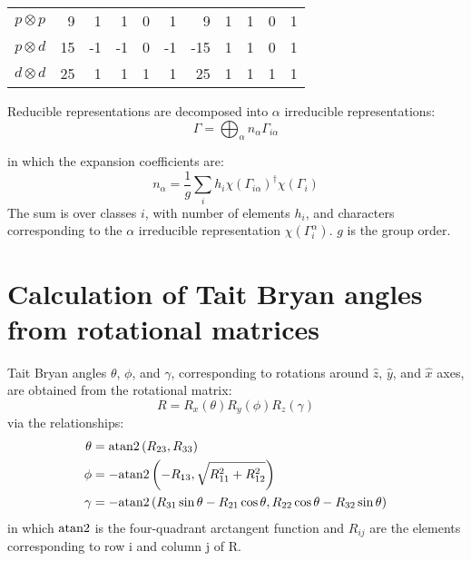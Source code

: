 \documentclass[preprint,showpacs,preprintnumbers,superscriptaddress,prb,floatfix,aps]{revtex4-1}
\begin{document}
\begin{table}
\begin{ruledtabular}
\begin{tabular*}{10cm}{llrrrrrrrrrr}
\multicolumn{2}{c}{$p \otimes p$} &  9  &      1 &     1  &     0  &     1  &   9  &          1  &          1  &          0  &          1  \\
\multicolumn{2}{c}{$p \otimes d$} & 15  &     -1 &    -1  &     0  &    -1  & -15  &          1  &          1  &          0  &          1  \\
\multicolumn{2}{c}{$d \otimes d$} & 25  &      1 &     1  &     1  &     1  &  25  &          1  &          1  &          1  &          1  \\
\end{tabular*}
\end{ruledtabular}
\end{table}

Reducible representations are decomposed into $\alpha$ irreducible representations:
\begin{equation}
\label{eq:irrep_decomposition}
\Gamma = \bigoplus_\alpha n_\alpha \Gamma_{i\alpha}
\end{equation}

in which the expansion coefficients are:
\begin{equation}
\label{eq:irrep_decomposition_coefficients}
n_\alpha = \frac{1}{g} \sum_i h_i \chi\left(\Gamma_{i\alpha}\right)^\dag \chi\left(\Gamma_i\right)
\end{equation}
The sum is over classes $i$, with number of elements $h_i$, and characters corresponding to the $\alpha$ irreducible representation $\chi(\Gamma_i^\alpha)$. $g$ is the group order.





%
%
%
\section{Calculation of Tait Bryan angles from rotational matrices}
Tait Bryan angles $\theta$, $\phi$, and $\gamma$, corresponding to rotations around $\hat{z}$, $\hat{y}$, and $\hat{x}$ axes, are obtained from the rotational matrix:
\begin{equation}
\label{eq:rotation}
R = R_x(\theta)R_y(\phi)R_z(\gamma)
\end{equation}
via the relationships:
\begin{align}
\label{eq:tait_bryan_angles}
\theta & = {\rm atan2}\left(R_{23},R_{33}\right) \\
\phi   & =-{\rm atan2}\left(-R_{13},\sqrt{R_{11}^2+R_{12}^2}\right) \\
\gamma & =-{\rm atan2}\left(R_{31}\sin{\theta}-R_{21}\cos{\theta},R_{22}\cos{\theta}-R_{32}\sin{\theta}\right)
\end{align}
in which ${\rm atan2}$ is the four-quadrant arctangent function and $R_{ij}$ are the elements corresponding to row i and column j of R. 
\end{document}
